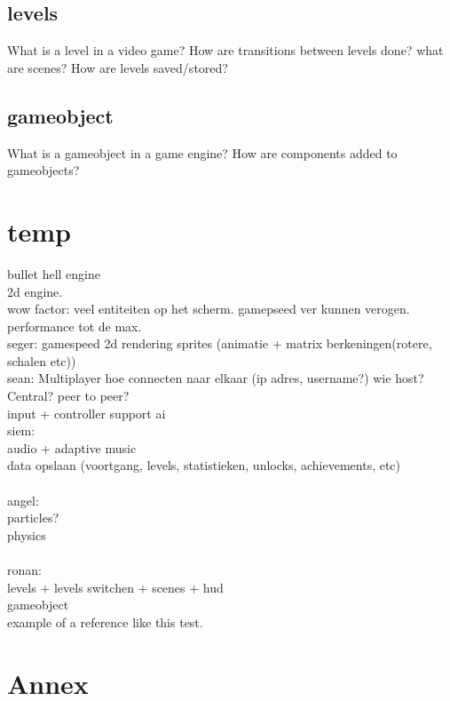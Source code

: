 \documentclass{article} %
\begin{document}
\subsection{levels}
What is a level in a video game?
How are transitions between levels done?
what are scenes?
How are levels saved/stored?
\subsection{gameobject}
What is a gameobject in a game engine?
How are components added to gameobjects?

\newpage

\section{temp}
bullet hell engine
\\
2d engine.
\\
wow factor: veel entiteiten op het scherm. gamepseed ver kunnen verogen.
performance tot de max.
\\
seger:
gamespeed
2d rendering
sprites (animatie + matrix berkeningen(rotere, schalen etc))
\\
sean:
Multiplayer
hoe connecten naar elkaar (ip adres, username?)
wie host? Central? peer to peer?
\\
input + controller support
ai
\\
siem:\\
audio + adaptive music\\
data opslaan (voortgang, levels, statistieken, unlocks, achievements, etc)\\
\\
angel:\\
particles?\\
physics\\
\\
ronan:\\
levels + levels switchen + scenes + hud \\
gameobject
\\

example of a reference \cite{Gambetta_2024} like this test.


\newpage

\section{Annex}
\printbibliography %
\end{document}
